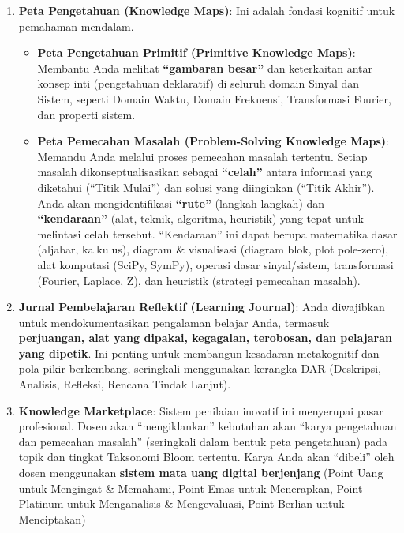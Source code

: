 \documentclass[
  letterpaper,
  DIV=11,
  numbers=noendperiod]{scrreprt}
\providecommand{\tightlist}{%
  \setlength{\itemsep}{0pt}\setlength{\parskip}{0pt}}
\begin{document}
\begin{enumerate}
\def\labelenumi{\arabic{enumi}.}
\item
  \textbf{Peta Pengetahuan (Knowledge Maps)}: Ini adalah fondasi
  kognitif untuk pemahaman mendalam.

  \begin{itemize}
  \tightlist
  \item
    \textbf{Peta Pengetahuan Primitif (Primitive Knowledge Maps)}:
    Membantu Anda melihat \textbf{``gambaran besar''} dan keterkaitan
    antar konsep inti (pengetahuan deklaratif) di seluruh domain Sinyal
    dan Sistem, seperti Domain Waktu, Domain Frekuensi, Transformasi
    Fourier, dan properti sistem.
  \item
    \textbf{Peta Pemecahan Masalah (Problem-Solving Knowledge Maps)}:
    Memandu Anda melalui proses pemecahan masalah tertentu. Setiap
    masalah dikonseptualisasikan sebagai \textbf{``celah''} antara
    informasi yang diketahui (``Titik Mulai'') dan solusi yang
    diinginkan (``Titik Akhir''). Anda akan mengidentifikasi
    \textbf{``rute''} (langkah-langkah) dan \textbf{``kendaraan''}
    (alat, teknik, algoritma, heuristik) yang tepat untuk melintasi
    celah tersebut. ``Kendaraan'' ini dapat berupa matematika dasar
    (aljabar, kalkulus), diagram \& visualisasi (diagram blok, plot
    pole-zero), alat komputasi (SciPy, SymPy), operasi dasar
    sinyal/sistem, transformasi (Fourier, Laplace, Z), dan heuristik
    (strategi pemecahan masalah).
  \end{itemize}
\item
  \textbf{Jurnal Pembelajaran Reflektif (Learning Journal)}: Anda
  diwajibkan untuk mendokumentasikan pengalaman belajar Anda, termasuk
  \textbf{perjuangan, alat yang dipakai, kegagalan, terobosan, dan
  pelajaran yang dipetik}. Ini penting untuk membangun kesadaran
  metakognitif dan pola pikir berkembang, seringkali menggunakan
  kerangka DAR (Deskripsi, Analisis, Refleksi, Rencana Tindak Lanjut).
\item
  \textbf{Knowledge Marketplace}: Sistem penilaian inovatif ini
  menyerupai pasar profesional. Dosen akan ``mengiklankan'' kebutuhan
  akan ``karya pengetahuan dan pemecahan masalah'' (seringkali dalam
  bentuk peta pengetahuan) pada topik dan tingkat Taksonomi Bloom
  tertentu. Karya Anda akan ``dibeli'' oleh dosen menggunakan
  \textbf{sistem mata uang digital berjenjang} (Point Uang untuk
  Mengingat \& Memahami, Point Emas untuk Menerapkan, Point Platinum
  untuk Menganalisis \& Mengevaluasi, Point Berlian untuk Menciptakan)

\end{enumerate}
\end{document}

